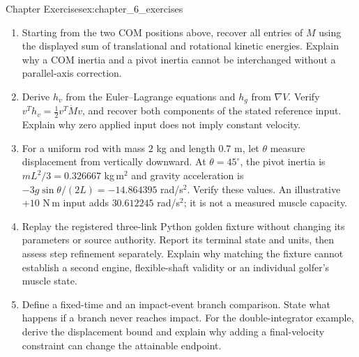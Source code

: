 \begin{exercises}{Chapter Exercises}{ex:chapter_6_exercises}
\begin{enumerate}
\item Starting from the two COM positions above, recover all entries of $M$ using the displayed sum of translational and rotational kinetic energies. Explain why a COM inertia and a pivot inertia cannot be interchanged without a parallel-axis correction.
\item Derive $h_v$ from the Euler--Lagrange equations and $h_g$ from $\nabla V$. Verify $v^Th_v=\tfrac12v^T\dot Mv$, and recover both components of the stated reference input. Explain why zero applied input does not imply constant velocity.
\item For a uniform rod with mass $2$ kg and length $0.7$ m, let $\theta$ measure displacement from vertically downward. At $\theta=45^\circ$, the pivot inertia is $mL^2/3=0.326667$ kg\,m$^2$ and gravity acceleration is $-3g\sin\theta/(2L)=-14.864395$ rad/s$^2$. Verify these values. An illustrative $+10$ N\,m input adds $30.612245$ rad/s$^2$; it is not a measured muscle capacity.
\item Replay the registered three-link Python golden fixture without changing its parameters or source authority. Report its terminal state and units, then assess step refinement separately. Explain why matching the fixture cannot establish a second engine, flexible-shaft validity or an individual golfer's muscle state.
\item Define a fixed-time and an impact-event branch comparison. State what happens if a branch never reaches impact. For the double-integrator example, derive the displacement bound and explain why adding a final-velocity constraint can change the attainable endpoint.
\end{enumerate}
\end{exercises}



